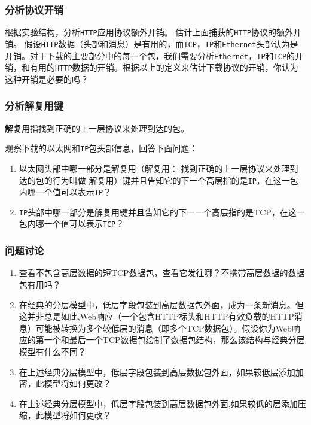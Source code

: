 \documentclass{article}
\begin{document}
\subsubsection{分析协议开销}

根据实验结构，分析\texttt{HTTP}应用协议额外开销。
估计上面捕获的\texttt{HTTP}协议的额外开销。
假设\texttt{HTTP}数据（头部和消息）是有用的，而\texttt{TCP}，\texttt{IP}和\texttt{Ethernet}头部认为是开销。对于下载的主要部分中的每一个包，我们需要分析\texttt{Ethernet}，\texttt{IP}和\texttt{TCP}的开销，和有用的\texttt{HTTP}数据的开销。根据以上的定义来估计下载协议的开销，你认为这种开销是必要的吗？

\subsubsection{分析解复用键}

\textbf{解复用}指找到正确的上一层协议来处理到达的包。

观察下载的以太网和\texttt{IP}包头部信息，回答下面问题：

\begin{enumerate}[noitemsep]
  \item 以太网头部中哪一部分是解复用（解复用： 找到正确的上一层协议来处理到达的包的行为叫做 解复用）键并且告知它的下一个高层指的是\texttt{IP}，在这一包内哪一个值可以表示\texttt{IP}？
  \item \texttt{IP}头部中哪一部分是解复用键并且告知它的下一一个高层指的是TCP，在这一包内哪一个值可以表示\texttt{TCP}？
\end{enumerate}

\subsubsection{问题讨论}

\begin{enumerate}[noitemsep]
  \item 查看不包含高层数据的短TCP数据包，查看它发往哪？不携带高层数据的数据包有用吗？
  
  \item 在经典的分层模型中，低层字段包装到高层数据包外面，成为一条新消息。但这并非总是如此,Web响应（一个包含HTTP标头和HTTP有效负载的HTTP消息）可能被转换为多个较低层的消息（即多个TCP数据包）。假设你为Web响应的第一个和最后一个TCP数据包绘制了数据包结构，那么该结构与经典分层模型有什么不同？
  
  \item 在上述经典分层模型中，低层字段包装到高层数据包外面，如果较低层添加加密，此模型将如何更改？
  
  \item 在上述经典分层模型中，低层字段包装到高层数据包外面,如果较低的层添加压缩，此模型将如何更改？
  
\end{enumerate}
\end{document}
